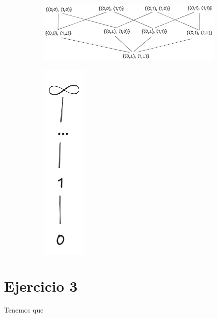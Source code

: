 \documentclass{article}
\begin{document}
\begin{figure}[!htb]
\begin{subfigure}[b]{0.3\textwidth}
		\caption{}
	\end{subfigure}
	\hfil
	\begin{subfigure}[b]{0.4\textwidth}
		\centering
		\includegraphics[width=\textwidth]{03-02-c.png}
		\caption{}
	\end{subfigure}
	\hfil
	\begin{subfigure}[b]{0.05\textwidth}
		\centering
		\includegraphics[width=\textwidth]{03-02-d.png}
		\caption{}
	\end{subfigure}
\end{figure}

\section*{Ejercicio 3}
Tenemos que
\end{document}
